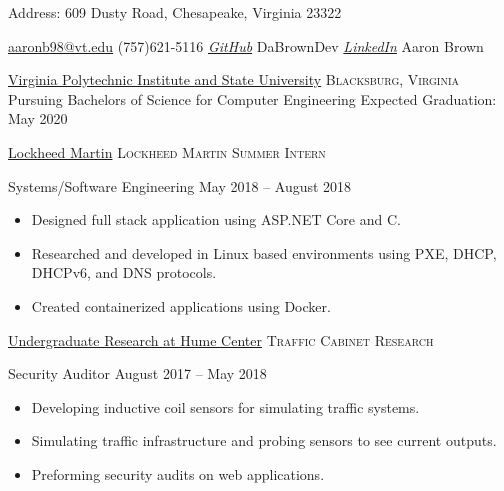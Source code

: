 \documentclass[10pt,a4paper]{article}
\newcommand{\CS}{C\nolinebreak\hspace{-.05em}\raisebox{.6ex}{\tiny\bf \#}}
\begin{document}
\sloppy  %
\raggedright


\par
Address: 609 Dusty Road, Chesapeake, Virginia 23322

\href{ mailto:aaronb98@vt.edu}{aaronb98\mbox{}@\mbox{}vt.edu}\sbull
\textsmaller{}(757)621-5116
\sbull \emph{\href{https://github.com/DaBrownDev}{GitHub}} DaBrownDev 
\sbull \emph{\href{https://www.linkedin.com/in/aaron-v-brown-ba3684101/}{LinkedIn}} Aaron Brown 


\spacedhrule{0.9em}{-0.4em}  %



\headedsection
  {\href{https://cyber.vt.edu/}{Virginia Polytechnic Institute and State University}}
  {\textsc{Blacksburg, Virginia}} {
  \headedsubsection
    {Pursuing Bachelors of Science for Computer Engineering}
    {Expected Graduation: May 2020}
    {  }
}
\smallskip
\spacedhrule{0.5em}{-0.4em}

%
%

\headedsection
  {\href{https://www.lockheedmartin.com/en-us/index.html}{Lockheed Martin}}
  {\small\textsc{Lockheed Martin Summer Intern}} {
  \headedsubsection
    {Systems/Software Engineering}
    {May 2018 -- August 2018}
    {\begin{itemize}
        \item Designed full stack application using ASP.NET Core and \CS.
        \item Researched and developed in Linux based environments using PXE, DHCP, DHCPv6, and DNS protocols.
        \item Created containerized applications using Docker.
    \end{itemize}}
}

\vspace{-0.2em}

\headedsection
{\href{https://www.hume.vt.edu/}{Undergraduate Research at Hume Center}}
  {\small\textsc{Traffic Cabinet Research}} {
  \headedsubsection
    {Security Auditor}
    {August 2017 -- May 2018}
    {\begin{itemize}
        \item Developing inductive coil sensors for simulating traffic systems.
        \item Simulating traffic infrastructure and probing sensors to see current outputs.
        \item Preforming security audits on web applications.
    \end{itemize}}
}
\end{document}
